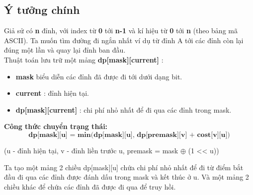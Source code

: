 \documentclass[11pt,a4paper,openany]{report}
\begin{document}
\subsection{Ý tưởng chính}
Giả sử có \textbf{n} đỉnh, với index từ \textbf{0} tới \textbf{n-1} và kí hiệu từ \textbf{0} tới \textbf{n} (theo bảng mã ASCII). Ta muốn tìm đường đi ngắn nhất ví dụ từ đỉnh A
tới các đỉnh còn lại đúng một lần và quay lại đỉnh ban đầu.\\
Thuật toán lưu trữ một mảng \textbf{dp[mask][current]} : 

\begin{itemize}
  \item \textbf{mask} biểu diễn các đỉnh đã được đi tới dưới dạng bit.
  \item \textbf{current} : đỉnh hiện tại. 
  \item \textbf{dp[mask][current]} : chi phí nhỏ nhất để đi qua các đỉnh trong mask.
\end{itemize}
\textbf{Công thức chuyển trạng thái:}
\[
  \textbf{dp[mask][u] = min(dp[mask][u], dp[premask][v] + cost[v][u])}
\]
\begin{center}
  {(u - đỉnh hiện tại, v - đỉnh liền trước u, premask = mask $\oplus$ (1 << u))}
\end{center}

\newpage
\noindent Ta tạo một mảng 2 chiều dp[mask][u] chứa chi phí nhỏ nhất để đi từ điểm bắt đầu đi qua các đỉnh được đánh dấu trong mask và kết thúc ở u. Và một mảng 2 chiều khác để chứa các đỉnh đã được đi qua để truy hồi.  
\end{document}
